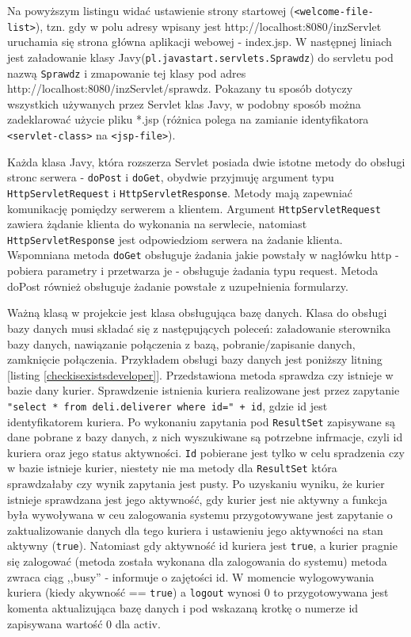 \documentclass[eng,printmode,oneside]{mgr}
\begin{document}
Na powyższym listingu widać ustawienie strony startowej
(\texttt{<welcome-file-list>}), tzn. gdy w polu adresy wpisany jest
http://localhost:8080/inzServlet uruchamia się strona główna aplikacji webowej -
index.jsp. W następnej liniach jest załadowanie klasy
Javy(\texttt{pl.javastart.servlets.Sprawdz}) do servletu pod nazwą
\texttt{Sprawdz} i zmapowanie tej klasy pod adres
http://localhost:8080/inzServlet/sprawdz. Pokazany tu sposób dotyczy wszystkich
używanych przez Servlet klas Javy, w podobny sposób można zadeklarować użycie
pliku *.jsp (różnica polega na zamianie identyfikatora \texttt{<servlet-class>}
na \texttt{<jsp-file>}). 

Każda klasa Javy, która rozszerza Servlet posiada dwie istotne metody do obsługi
stronc serwera - \texttt{doPost} i \texttt{doGet}, obydwie przyjmuję argument
typu \texttt{HttpServletRequest} i \texttt{HttpServletResponse}.
Metody mają zapewniać komunikację pomiędzy serwerem a klientem. Argument
\texttt{HttpServletRequest} zawiera żądanie klienta do wykonania na serwlecie,
natomiast \texttt{HttpServletResponse} jest odpowiedziom serwera na żadanie
klienta.
Wspomniana metoda \texttt{doGet} obsługuje żadania jakie powstały w nagłówku http - pobiera
parametry i przetwarza je - obsługuje żadania typu request. Metoda doPost
również obsługuje żadanie powstałe z uzupełnienia formularzy. 

Ważną klasą w projekcie jest klasa obsługująca bazę danych. Klasa do obsługi
bazy danych musi składać się z następujących poleceń: załadowanie sterownika
bazy danych, nawiązanie połączenia z bazą, pobranie/zapisanie danych, zamknięcie
połączenia. Przykładem obsługi bazy danych jest poniższy litning [listing
\ref{checkisexistsdeveloper}]. Przedstawiona metoda sprawdza czy istnieje w
bazie dany kurier. Sprawdzenie istnienia kuriera realizowane jest przez
zapytanie \texttt{"select * from deli.deliverer where id=" + id}, gdzie id jest
identyfikatorem kuriera. Po wykonaniu zapytania pod \texttt{ResultSet}
zapisywane są dane pobrane z bazy danych, z nich wyszukiwane są potrzebne infrmacje, czyli
id kuriera oraz jego status aktywności. \texttt{Id} pobierane jest tylko w celu
spradzenia czy w bazie istnieje kurier, niestety nie ma metody dla
\texttt{ResultSet} która sprawdzałaby czy wynik zapytania jest pusty. Po
uzyskaniu wyniku, że kurier istnieje sprawdzana jest jego aktywność, gdy kurier
jest nie aktywny a funkcja była wywoływana w ceu zalogowania systemu
przygotowywane jest zapytanie o zaktualizowanie danych dla tego kuriera i
ustawieniu jego aktywności na stan aktywny (\texttt{true}). Natomiast gdy
aktywność id kuriera jest \texttt{true}, a kurier pragnie się zalogować (metoda została
wykonana dla zalogowania do systemu) metoda zwraca ciąg ,,busy'' - informuje o zajętości id.
W momencie wylogowywania kuriera (kiedy akywność == \texttt{true}) a
\texttt{logout} wynosi 0 to przygotowywana jest komenta aktualizująca bazę
danych i pod wskazaną krotkę o numerze id zapisywana wartość 0 dla activ.
\end{document}
